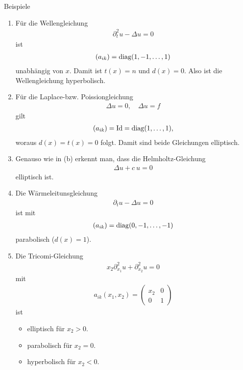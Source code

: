 \begin{genericdf}{Beispiele}
\renewcommand{\labelenumi}{(\alph{enumi})}
\begin{enumerate}
\item 
Für die Wellengleichung 
\begin{align*}
\partial^2_t u - \Delta u = 0
\end{align*}
ist
\begin{align*}
(a_{ik}) = \operatorname{diag}(1,-1, \dots, \-1)
\end{align*}
unabhängig von $x$.
Damit ist $t(x) = n$ und $d(x) = 0$.
Also ist die Wellengleichung hyperbolisch.

\item
Für die Laplace-bzw. Poissiongleichung
\begin{align*}
\Delta u = 0, \quad \Delta u = f
\end{align*}
gilt
\begin{align*}
(a_{ik}) = \operatorname{Id} = \operatorname{diag}(1, \dots, 1),
\end{align*}
woraus $d(x) = t(x) = 0$ folgt.
Damit sind beide Gleichungen elliptisch.

\item
Genauso wie in (b) erkennt man, dass die Helmholtz-Gleichung
\begin{align*}
\Delta u + c \ u = 0
\end{align*}
elliptisch ist.

\item
Die Wärmeleitunsgleichung 
\begin{align*}
\partial_t u - \Delta u  = 0 
\end{align*}
ist mit 
\begin{align*}
(a_{ik}) = \operatorname{diag}(0,-1, \dots , -1)
\end{align*}
parabolisch ($d(x) = 1$).

\item
Die Tricomi-Gleichung
\begin{align*}
x_2 \partial_{x_1}^2 u + \partial_{x_2}^2 u = 0
\end{align*}
mit 
\begin{align*}
a_{ik}(x_1,x_2) = 
\begin{pmatrix}
x_2 & 0 \\
0  & 1 
\end{pmatrix}
\end{align*}
ist 
\begin{itemize}
\item elliptisch für $x_2 > 0$.
\item parabolisch für $x_2 = 0$.
\item hyperbolisch für $x_2 < 0$.
\end{itemize}
\end{enumerate}
\end{genericdf} 